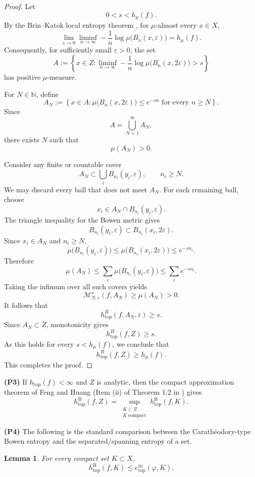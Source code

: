 \documentclass[11pt,reqno]{amsart}
\newtheorem{lemma}[theorem]{Lemma}
\theoremstyle{definition}
\theoremstyle{remark}
\newcommand{\htop}{h_{\mathrm{top}}}
\newcommand{\hB}{h^{\mathrm{B}}_{\mathrm{top}}}
\newcommand{\hE}{e^{\mathrm{uc}}_{\mathrm{top}}}
\begin{document}
\begin{proof}
Let
\[
0<s<h_\mu(f).
\]
By the Brin--Katok local entropy theorem \cite{bk}, for $\mu$-almost every
$x\in X$,
\[
\lim_{\varepsilon\to0}
\liminf_{n\to\infty}
-\frac1n\log\mu\bigl(B_n(x,\varepsilon)\bigr)
=
h_\mu(f).
\]
Consequently, for sufficiently small $\varepsilon>0$, the set
\[
A
:=
\left\{
x\in Z:
\liminf_{n\to\infty}
-\frac1n\log\mu\bigl(B_n(x,2\varepsilon)\bigr)>s
\right\}
\]
has positive $\mu$-measure.

For $N\in\mathbb{N}$, define
\[
A_N
:=
\left\{
x\in A:
\mu\bigl(B_n(x,2\varepsilon)\bigr)
\leq e^{-sn}
\text{ for every }n\geq N
\right\}.
\]
Since
\[
A=\bigcup_{N=1}^{\infty}A_N,
\]
there exists $N$ such that
\[
\mu(A_N)>0.
\]

Consider any finite or countable cover
\[
A_N\subset\bigcup_i B_{n_i}(y_i,\varepsilon),
\qquad n_i\geq N.
\]
We may discard every ball that does not meet $A_N$. For each remaining
ball, choose
\[
x_i\in A_N\cap B_{n_i}(y_i,\varepsilon).
\]
The triangle inequality for the Bowen metric gives
\[
B_{n_i}(y_i,\varepsilon)
\subset
B_{n_i}(x_i,2\varepsilon).
\]
Since $x_i\in A_N$ and $n_i\geq N$,
\[
\mu\bigl(B_{n_i}(y_i,\varepsilon)\bigr)
\leq
\mu\bigl(B_{n_i}(x_i,2\varepsilon)\bigr)
\leq e^{-s n_i}.
\]
Therefore
\[
\mu(A_N)
\leq
\sum_i\mu\bigl(B_{n_i}(y_i,\varepsilon)\bigr)
\leq
\sum_i e^{-s n_i}.
\]
Taking the infimum over all such covers yields
\[
\mathcal{M}_{N,\varepsilon}^{s}(f,A_N)
\geq\mu(A_N)>0.
\]
It follows that
\[
h_{\mathrm{top}}^B(f,A_N,\varepsilon)\geq s.
\]
Since $A_N\subset Z$, monotonicity gives
\[
h_{\mathrm{top}}^B(f,Z)\geq s.
\]
As this holds for every $s<h_\mu(f)$, we conclude that
\[
h_{\mathrm{top}}^B(f,Z)\geq h_\mu(f).
\]
This completes the proof.
\end{proof}




\noindent
{\bf (P3)}
If $\htop(f)<\infty$ and $Z$ is analytic, then the compact
approximation theorem of Feng and Huang (Item (ii) of Theorem 1.2 in \cite{fh}) gives
\[
\hB(f,Z)
=
\sup_{\substack{K\subset Z\\K\ \mathrm{compact}}}
\hB(f,K).
\]

\noindent
{\bf (P4)}
The following is the standard comparison between the Carath\'eodory-type Bowen
entropy and the separated/spanning entropy of a set.




\begin{lemma}
\label{l6}
For every compact set $K\subset X$,
\[
\hB(f,K)\leq\hE(\varphi,K).
\]
\end{lemma}
\end{document}
